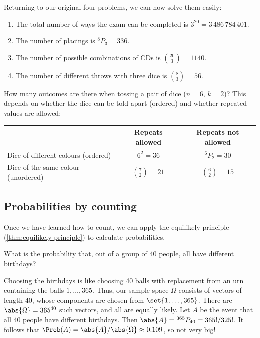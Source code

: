 Returning to our original four problems, we can now solve them easily:
\begin{enumerate}
  \item The total number of ways the exam can be completed is $3^{20} = 3\,486\,784\,401$.
  \item The number of placings is ${}^8P_3 = 336$.
  \item The number of possible combinations of CDs is $\binom{20}{3} = 1140$.
  \item The number of different throws with three dice is $\binom{8}{3} = 56$.
\end{enumerate}

\begin{example}\label{ex:counting-pair-of-dice}
How many outcomes are there when tossing a pair of dice ($n = 6$, $k = 2$)? This depends on whether the dice can be told apart (ordered) and whether repeated values are allowed:
\begin{center}
\begin{tabular}{@{}lcc@{}}
\toprule
 & Repeats allowed & Repeats not allowed \\
\midrule
Dice of different colours (ordered) & $6^2 = 36$ & ${}^6P_2 = 30$ \\
Dice of the same colour (unordered) & $\binom{7}{2} = 21$ & $\binom{6}{2} = 15$ \\
\bottomrule
\end{tabular}
\end{center}
\end{example}

\subsection{Probabilities by counting}\label{sec:probabilities-by-counting}

Once we have learned how to count, we can apply the equilikely principle (\cref{thm:equilikely-principle}) to calculate probabilities.

\begin{example}\label{ex:birthday-counting}
What is the probability that, out of a group of 40 people, all have different birthdays?
\end{example}

\begin{solution}
Choosing the birthdays is like choosing 40 balls with replacement from an urn containing the balls $1, \ldots, 365$. Thus, our sample space $\Omega$ consists of vectors of length 40, whose components are chosen from $\set{1, \ldots, 365}$. There are $\abs{\Omega} = 365^{40}$ such vectors, and all are equally likely. Let $A$ be the event that all 40 people have different birthdays. Then $\abs{A} = {}^{365}P_{40} = 365!/325!$. It follows that $\Prob(A) = \abs{A}/\abs{\Omega} \approx 0.109$, so not very big!
\end{solution}

